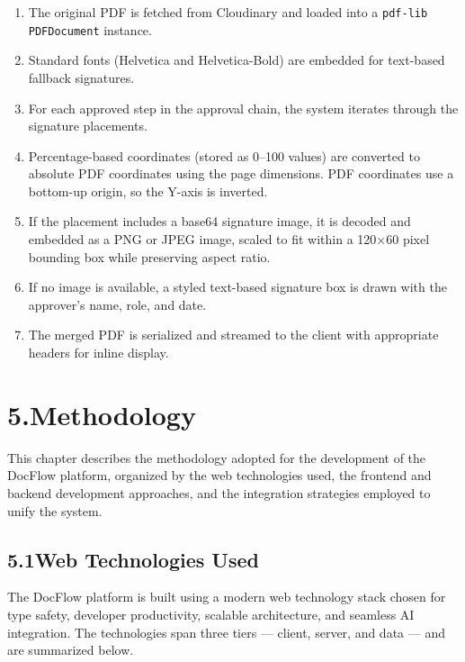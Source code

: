 \documentclass[12pt,a4paper]{report}
\newcommand{\citeref}[1]{%
  \textcolor{citeborder}{%
    \fboxsep=2pt%
    \fcolorbox{citeborder}{citebg}{\footnotesize\bfseries[#1]}%
  }%
}
\begin{document}
\begin{enumerate}
    \item The original PDF is fetched from Cloudinary and loaded into a \texttt{pdf-lib} \citeref{8} \texttt{PDFDocument} instance.
    \item Standard fonts (Helvetica and Helvetica-Bold) are embedded for text-based fallback signatures.
    \item For each approved step in the approval chain, the system iterates through the signature placements.
    \item Percentage-based coordinates (stored as 0--100 values) are converted to absolute PDF coordinates using the page dimensions. PDF coordinates use a bottom-up origin, so the Y-axis is inverted.
    \item If the placement includes a base64 signature image, it is decoded and embedded as a PNG or JPEG image, scaled to fit within a 120×60 pixel bounding box while preserving aspect ratio.
    \item If no image is available, a styled text-based signature box is drawn with the approver's name, role, and date.
    \item The merged PDF is serialized and streamed to the client with appropriate headers for inline display.
\end{enumerate}

\chapter*{5.\quad Methodology}

This chapter describes the methodology adopted for the development of the DocFlow platform, organized by the web technologies used, the frontend and backend development approaches, and the integration strategies employed to unify the system.

\section*{5.1\quad Web Technologies Used}

The DocFlow platform is built using a modern web technology stack chosen for type safety, developer productivity, scalable architecture, and seamless AI integration. The technologies span three tiers --- client, server, and data --- and are summarized below.
\end{document}
